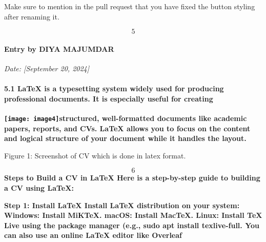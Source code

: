 \documentclass{article} %
\begin{document}
\noindent Make sure to mention in the pull request that you have fixed the button styling after renaming it.

\noindent 
\[5\] 

\paragraph{Entry by DIYA MAJUMDAR}

\noindent \textit{Date: [September 20, 2024]}

\noindent \textit{}

\noindent 
\paragraph{5.1  LaTeX is a typesetting system widely used for producing professional documents. It is especially useful for creating}

\noindent \textbf{\texttt{[image: image4]}structured, well-formatted documents like academic papers, reports, and CVs. LaTeX allows you to focus on the content and logical structure of your document while it handles the layout.}

\noindent \textbf{}

\noindent \textbf{}

\noindent \textbf{}

\noindent \textbf{}

\noindent Figure 1: Screenshot of CV which is done in latex format.

\noindent 

\noindent 

\noindent 

\noindent 
\[6\] 
\textbf{Steps to Build a CV in LaTeX Here is a step-by-step guide to building a CV using LaTeX:}

\noindent \textbf{}

\noindent \textbf{Step 1: Install LaTeX Install LaTeX distribution on your system: Windows: Install MiKTeX. macOS: Install MacTeX. Linux: Install TeX Live using the package manager (e.g., sudo apt install texlive-full. You can also use an online LaTeX editor like Overleaf}

\noindent \textbf{}

\noindent \textbf{}

\noindent \textbf{}

\noindent \textbf{}

\noindent \textbf{}

\noindent \textbf{}
\end{document}
